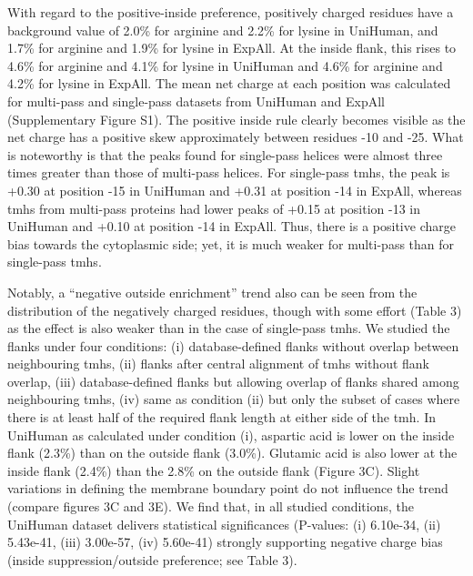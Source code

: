 With regard to the positive-inside preference, positively charged residues have a background value of 2.0\% for arginine and 2.2\% for lysine in UniHuman, and 1.7\% for arginine and 1.9\% for lysine in ExpAll. At the inside flank, this rises to 4.6\% for arginine and 4.1\% for lysine in UniHuman and 4.6\% for arginine and 4.2\% for lysine in ExpAll. The mean net charge at each position was calculated for multi-pass and single-pass datasets from UniHuman and ExpAll (Supplementary Figure S1). The positive inside rule clearly becomes visible as the net charge has a positive skew approximately between residues -10 and -25. What is noteworthy is that the peaks found for single-pass helices were almost three times greater than those of multi-pass helices. For single-pass \gls{tmh}s, the peak is +0.30 at position -15 in UniHuman and +0.31 at position -14 in ExpAll, whereas \gls{tmh}s from multi-pass proteins had lower peaks of +0.15 at position -13 in UniHuman and +0.10 at position -14 in ExpAll. Thus, there is a positive charge bias towards the cytoplasmic side; yet, it is much weaker for multi-pass than for single-pass \gls{tmh}s.

Notably, a ``negative outside enrichment'' trend also can be seen from the distribution of the negatively charged residues, though with some effort (Table 3) as the effect is also weaker than in the case of single-pass \gls{tmh}s. We studied the flanks under four conditions: (i) database-defined flanks without overlap between neighbouring \gls{tmh}s, (ii) flanks after central alignment of \gls{tmh}s without flank overlap, (iii) database-defined flanks but allowing overlap of flanks shared among neighbouring \gls{tmh}s, (iv) same as condition (ii) but only the subset of cases where there is at least half of the required flank length at either side of the \gls{tmh}. In UniHuman as calculated under condition (i), aspartic acid is lower on the inside flank (2.3\%) than on the outside flank (3.0\%). Glutamic acid is also lower at the inside flank (2.4\%) than the 2.8\% on the outside flank (Figure 3C). Slight variations in defining the membrane boundary point do not influence the trend (compare figures 3C and 3E). We find that, in all studied conditions, the UniHuman dataset delivers statistical significances (P-values: (i) 6.10e-34, (ii) 5.43e-41, (iii) 3.00e-57, (iv) 5.60e-41) strongly supporting negative charge bias (inside suppression/outside preference; see Table 3).

